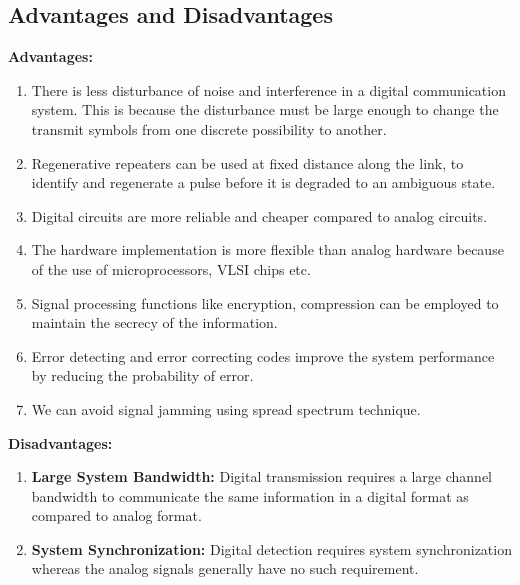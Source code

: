 \subsection{Advantages and Disadvantages}

\textbf{Advantages:}

\begin{enumerate}

  \item There is less disturbance of noise and interference in a digital
  communication system. This is because the disturbance must be large enough to
  change the transmit symbols from one discrete possibility to another.

  \item Regenerative repeaters can be used at fixed distance along the link, to
  identify and regenerate a pulse before it is degraded to an ambiguous state.

  \item Digital circuits are more reliable and cheaper compared to analog
  circuits.

  \item The hardware implementation is more flexible than analog hardware because
  of the use of microprocessors, VLSI chips etc.

  \item Signal processing functions like encryption, compression can be employed
  to maintain the secrecy of the information.

  \item Error detecting and error correcting codes improve the system performance
  by reducing the probability of error.


  \item We can avoid signal jamming using spread spectrum technique.

\end{enumerate}

\textbf{Disadvantages:}

\begin{enumerate}

  \item \textbf{Large System Bandwidth:} Digital transmission requires a large channel
  bandwidth to communicate the same information in a digital format as compared to
  analog format.

  \item \textbf{System Synchronization:} Digital detection requires system synchronization
  whereas the analog signals generally have no such requirement.

\end{enumerate}

